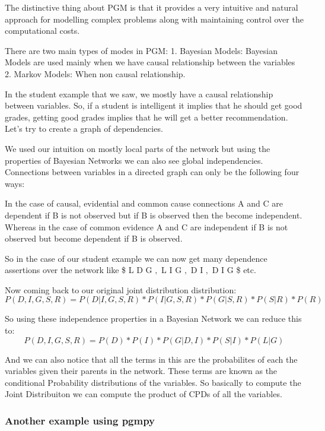 \documentclass{article}
\begin{document}
The distinctive thing about PGM is that it provides a very intuitive and
natural approach for modelling complex problems along with maintaining
control over the computational costs.

    There are two main types of modes in PGM: 1. Bayesian Models: Bayesian
Models are used mainly when we have causal relationship between the
variables 2. Markov Models: When non causal relationship.

    In the student example that we saw, we mostly have a causal relationship
between variables. So, if a student is intelligent it implies that he
should get good grades, getting good grades implies that he will get a
better recommendation. Let's try to create a graph of dependencies.

    

    We used our intuition on mostly local parts of the network but using the
properties of Bayesian Networks we can also see global independencies.
Connections between variables in a directed graph can only be the
following four ways:

    

    In the case of causal, evidential and common cause connections A and C
are dependent if B is not observed but if B is observed then the become
independent. Whereas in the case of common evidence A and C are
independent if B is not observed but become dependent if B is observed.

So in the case of our student example we can now get many dependence
assertions over the network like \$ L \perp D \textbar{} G $, $ L
\perp I \textbar{} G $, $ D \perp I $, $ D \not\perp I \textbar{} G \$
etc.

    Now coming back to our original joint distribution distribution:
\[ P(D, I, G, S, R) = P(D | I, G, S, R) * P(I | G, S, R) * P(G | S, R) * P(S | R) * P(R) \]

So using these independence properties in a Bayesian Network we can
reduce this to:
\[ P(D, I, G, S, R) = P(D) * P(I) * P(G | D, I) * P(S | I) * P(L | G) \]

And we can also notice that all the terms in this are the probabilites
of each the variables given their parents in the network. These terms
are known as the conditional Probability distributions of the variables.
So basically to compute the Joint Distribuiton we can compute the
product of CPDs of all the variables.

    \subsubsection{Another example using
pgmpy}\label{another-example-using-pgmpy}
\end{document}
